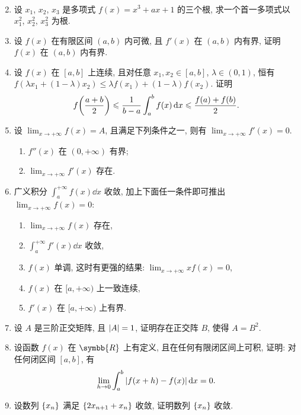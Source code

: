 \documentclass{ctexart}
\let\set\qty
\let\le\leqslant
\newcommand{\limit}[2]{\lim_{#1 \to #2}}
\newcommand{\R}{\ensuremath{\symbb{R}}}
\begin{document}
\begin{enumerate}[series=exer]
\begin{align*}
    \end{align*}
    \item 设 $ x_{1} $, $ x_{2} $, $ x_{3} $ 是多项式 $ f(x) = x^{3} + ax + 1 $ 的三个根, 求一个首一多项式以 $ x_{1}^{2} $, $ x_{2}^{2} $, $ x_{3}^{2} $ 为根.
    \item 设 $ f(x) $ 在有限区间 $ (a, b) $ 内可微, 且 $ f'(x) $ 在 $ (a, b) $ 内有界, 证明 $ f(x) $ 在 $ (a, b) $ 内有界.
    \item 设 $ f(x) $ 在 $ [a, b] $ 上连续, 且对任意 $ x_{1}, x_{2} \in [a, b] $, $ \lambda \in (0, 1) $, 恒有 $ f(\lambda x_{1} + (1-\lambda) x_{2}) \le \lambda f(x_{1}) + (1 - \lambda) f(x_{2}) $. 证明
    \begin{align*}
        f\qty(\frac{a+b}{2}) \le \frac{1}{b - a}\int_{a}^{b} f(x) \dd{x} \le \frac{f(a) + f(b)}{2}.
    \end{align*}
    \item 设 $ \limit{x}{+\infty} f(x) = A $, 且满足下列条件之一, 则有 $ \limit{x}{+\infty} f'(x) = 0 $.
    \begin{enumerate}
        \item $ f''(x) $ 在 $ (0, +\infty) $ 有界;
        \item $ \limit{x}{+\infty} f'(x) $ 存在.
    \end{enumerate}
    \item 广义积分 $ \int_{a}^{+\infty} f(x) \dd{x} $ 收敛, 加上下面任一条件即可推出 $ \limit{x}{+\infty} f(x) = 0 $:
    \begin{enumerate}
        \item $ \limit{x}{+\infty} f(x) $ 存在,
        \item $ \int_{a}^{+\infty} f'(x) \dd{x} $ 收敛,
        \item $ f(x) $ 单调, 这时有更强的结果: $ \limit{x}{+\infty} xf(x) = 0 $,
        \item $ f(x) $ 在 $ [a, +\infty) $ 上一致连续,
        \item $ f'(x) $ 在 $ [a, +\infty) $ 上有界. 
    \end{enumerate}
    \item 设 $ A $ 是三阶正交矩阵, 且 $ \abs{A} = 1 $, 证明存在正交阵 $ B $, 使得 $ A = B^{2} $.  
    \item 设函数 $ f(x) $ 在 $ \R $ 上有定义, 且在任何有限闭区间上可积, 证明: 对任何闭区间 $ [a, b] $, 有
    \begin{align*}
        \limit{h}{0} \int_{a}^{b} \abs{f(x + h) - f(x)} \dd{x} = 0.
    \end{align*}
    \item 设数列 $ \set{x_{n}} $ 满足 $ \set{2x_{n+1} + x_{n}} $ 收敛, 证明数列 $ \set{x_{n}} $ 收敛. 

\end{enumerate}
\end{document}

